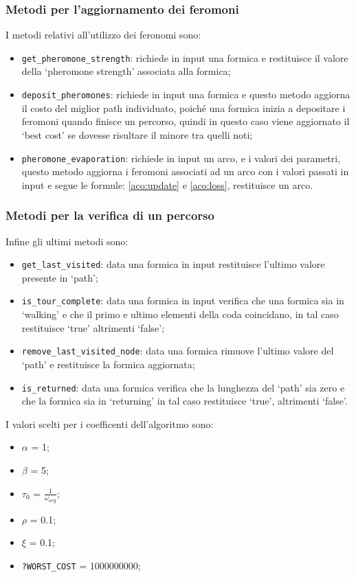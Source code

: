 \subsubsection{Metodi per l'aggiornamento dei feromoni}
I metodi relativi all'utilizzo dei feronomi sono:
\begin{itemize}
    \item \texttt{get\_pheromone\_strength}: richiede in input una formica e restituisce il valore della `pheromone strength' associata alla formica;
    \item \texttt{deposit\_pheromones}: richiede in input una formica e questo metodo aggiorna il costo del miglior path individuato, poiché una formica inizia a depositare i feromoni quando finisce un percorso, quindi in questo caso viene aggiornato il `best cost' se dovesse risultare il minore tra quelli noti;
    \item \texttt{pheromone\_evaporation}: richiede in input un arco, e i valori dei parametri, questo metodo aggiorna i feromoni associati ad un arco con i valori passati in input e segue le formule: \ref{aco:update} e \ref{aco:loss}, restituisce un arco.
\end{itemize}

\subsubsection{Metodi per la verifica di un percorso}
Infine gli ultimi metodi sono:
\begin{itemize}
    \item \texttt{get\_last\_visited}: data una formica in input restituisce l'ultimo valore presente in `path';
    \item \texttt{is\_tour\_complete}: data una formica in input verifica che una formica sia in `walking' e che il primo e ultimo elementi della coda coincidano, in tal caso restituisce `true' altrimenti `false';
    \item \texttt{remove\_last\_visited\_node}: data una formica rimuove l'ultimo valore del `path' e restituisce la formica aggiornata;
    \item \texttt{is\_returned}: data una formica verifica che la lunghezza del `path' sia zero e che la formica sia in `returning' in tal caso restituisce `true', altrimenti `false'.
\end{itemize}

I valori scelti per i coefficenti dell'algoritmo sono:
\begin{itemize}
    \item $\alpha$ = 1;
    \item $\beta$ = 5;
    \item $\tau_0$ = $\frac{1}{\omega_{avg}}$;
    \item $\rho$ = 0.1;
    \item $\xi$ = 0.1;
    \item \texttt{?WORST\_COST} = 1000000000;
\end{itemize}

